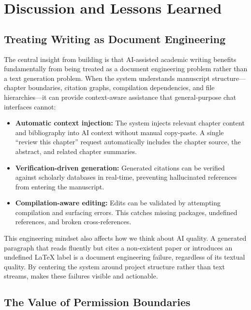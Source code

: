 \section{Discussion and Lessons Learned}
\label{sec:discussion}

\subsection{Treating Writing as Document Engineering}

The central insight from building \software{} is that AI-assisted academic
writing benefits fundamentally from being treated as a document engineering
problem rather than a text generation problem. When the system understands
manuscript structure---chapter boundaries, citation graphs, compilation
dependencies, and file hierarchies---it can provide context-aware assistance
that general-purpose chat interfaces cannot:

\begin{itemize}
  \item \textbf{Automatic context injection:} The system injects relevant
  chapter content and bibliography into AI context without manual copy-paste.
  A single ``review this chapter'' request automatically includes the chapter
  source, the abstract, and related chapter summaries.
  \item \textbf{Verification-driven generation:} Generated citations can be
  verified against scholarly databases in real-time, preventing hallucinated
  references from entering the manuscript.
  \item \textbf{Compilation-aware editing:} Edits can be validated by
  attempting compilation and surfacing errors. This catches missing packages,
  undefined references, and broken cross-references.
\end{itemize}

This engineering mindset also affects how we think about AI quality. A
generated paragraph that reads fluently but cites a non-existent paper or
introduces an undefined \LaTeX{} label is a document engineering failure,
regardless of its textual quality. By centering the system around project
structure rather than text streams, \software{} makes these failures visible
and actionable.

\subsection{The Value of Permission Boundaries}

